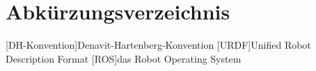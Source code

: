 \chapter*{Abkürzungsverzeichnis}

\begin{acronym}
 [DH-Konvention]{Denavit-Hartenberg-Konvention}
 [URDF]{Unified Robot Description Format}
 [ROS]{das Robot Operating System}
\end{acronym}

